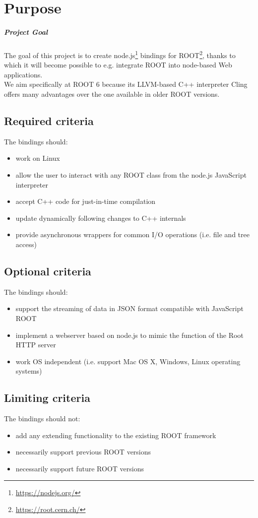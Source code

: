 \chapter{Purpose}
\paragraph{Project Goal}
The goal of this project is to create node.js\textsuperscript{\textregistered}\footnote{\url{https://nodejs.org/}} bindings for
ROOT\footnote{\url{https://root.cern.ch/}}, thanks to which it will become possible to e.g. integrate ROOT into node-based Web applications.\\
We aim specifically at ROOT 6 because its LLVM-based C++ interpreter Cling offers many advantages over the one available in older ROOT versions.
\section{Required criteria}
The bindings should:
\begin{itemize}
	\item work on Linux
	\item allow the user to interact with any ROOT class from the node.js JavaScript interpreter
	\item accept C++ code for just-in-time compilation
	\item update dynamically following changes to C++ internals
	\item provide asynchronous wrappers for common I/O operations (i.e. file and tree access)
\end{itemize}
\pagebreak[3]

\section{Optional criteria}
The bindings should:
\begin{itemize}
	\item support the streaming of data in JSON format compatible with JavaScript ROOT
	\item implement a webserver based on node.js to mimic the function of the Root HTTP server
	\item work OS independent (i.e. support Mac OS X, Windows, Linux operating systems)
\end{itemize}

\section{Limiting criteria}
The bindings should not:
\begin{itemize}
	\item add any extending functionality to the existing ROOT framework
	\item necessarily support previous ROOT versions
	\item necessarily support future ROOT versions
\end{itemize}
